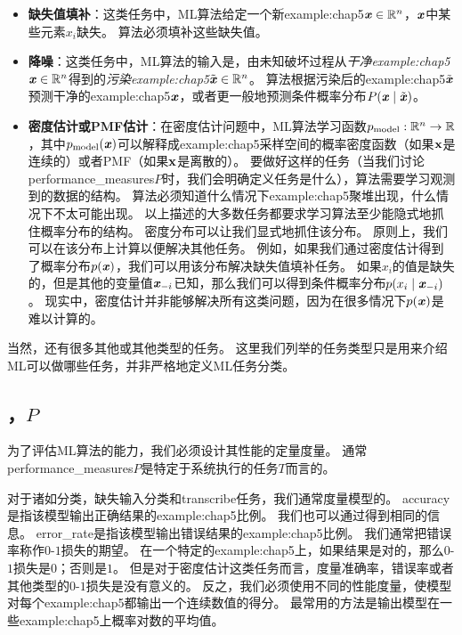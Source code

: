 \begin{itemize}
    \item \textbf{缺失值填补}：这类任务中，\gls{ML}算法给定一个新\gls{example:chap5}$\boldsymbol{\mathit{x}}\in\mathbb{R}^n$，$\boldsymbol{\mathit{x}}$中某些元素$x_i$缺失。
    算法必须填补这些缺失值。


    \item \textbf{降噪}：这类任务中，\gls{ML}算法的输入是，由未知破坏过程从\emph{干净\gls{example:chap5}}$\boldsymbol{\mathit{x}} \in \mathbb{R}^n$得到的\emph{污染\gls{example:chap5}}$\tilde{\boldsymbol{\mathit{x}}} \in \mathbb{R}^n$。
    算法根据污染后的\gls{example:chap5}$\tilde{\boldsymbol{\mathit{x}}}$预测干净的\gls{example:chap5}$\boldsymbol{\mathit{x}}$，或者更一般地预测条件概率分布$P(\boldsymbol{\mathit{x}}\mid\tilde{\boldsymbol{\mathit{x}}})$。
    
    \item \textbf{密度估计}\textbf{或}\textbf{\gls{PMF}估计}：在密度估计问题中，\gls{ML}算法学习函数$p_{\text{model}}:\mathbb{R}^n \to \mathbb{R}$，其中$p_{\text{model}}(\boldsymbol{\mathit{x}})$可以解释成\gls{example:chap5}采样空间的概率密度函数（如果$\mathbf{x}$是连续的）或者\gls{PMF}（如果$\mathbf{x}$是离散的）。
    要做好这样的任务（当我们讨论\gls{performance_measures}$P$时，我们会明确定义任务是什么），算法需要学习观测到的数据的结构。
    算法必须知道什么情况下\gls{example:chap5}聚堆出现，什么情况下不太可能出现。
    以上描述的大多数任务都要求学习算法至少能隐式地抓住概率分布的结构。
    密度分布可以让我们显式地抓住该分布。
    原则上，我们可以在该分布上计算以便解决其他任务。
    例如，如果我们通过密度估计得到了概率分布$p(\boldsymbol{\mathit{x}})$，我们可以用该分布解决缺失值填补任务。
    如果$x_i$的值是缺失的，但是其他的变量值$\boldsymbol{\mathit{x}}_{-i}$已知，那么我们可以得到条件概率分布$p(x_i\mid\boldsymbol{\mathit{x}}_{-i})$。
    现实中，密度估计并非能够解决所有这类问题，因为在很多情况下$p(\boldsymbol{\mathit{x}})$是难以计算的。
\end{itemize}

当然，还有很多其他或其他类型的任务。
这里我们列举的任务类型只是用来介绍\gls{ML}可以做哪些任务，并非严格地定义\gls{ML}任务分类。

\subsection{，$P$}
\label{sec:the_performance_measure_p}
为了评估\gls{ML}算法的能力，我们必须设计其性能的定量度量。
通常\gls{performance_measures}$P$是特定于系统执行的任务$T$而言的。

对于诸如分类，缺失输入分类和\gls{transcribe}任务，我们通常度量模型的。
\gls{accuracy}是指该模型输出正确结果的\gls{example:chap5}比例。
我们也可以通过得到相同的信息。
\gls{error_rate}是指该模型输出错误结果的\gls{example:chap5}比例。
我们通常把错误率称作$0$-$1$损失的期望。
在一个特定的\gls{example:chap5}上，如果结果是对的，那么$0$-$1$损失是$0$；否则是$1$。
但是对于密度估计这类任务而言，度量准确率，错误率或者其他类型的$0$-$1$损失是没有意义的。
反之，我们必须使用不同的性能度量，使模型对每个\gls{example:chap5}都输出一个连续数值的得分。
最常用的方法是输出模型在一些\gls{example:chap5}上概率对数的平均值。


